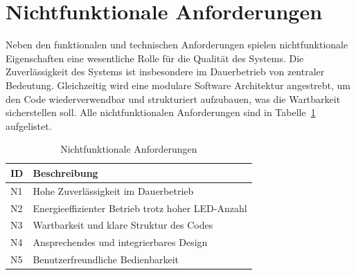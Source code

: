 \section{Nichtfunktionale Anforderungen}
Neben den funktionalen und technischen Anforderungen spielen nichtfunktionale Eigenschaften eine wesentliche Rolle für die Qualität des Systems.
Die Zuverlässigkeit des Systems ist insbesondere im Dauerbetrieb von zentraler Bedeutung.
Gleichzeitig wird eine modulare Software Architektur angestrebt, um den Code wiederverwendbar und strukturiert aufzubauen, was die Wartbarkeit sicherstellen soll.
Alle nichtfunktionalen Anforderungen sind in Tabelle~\ref{tab:Nichtfunktionale Anforderung} aufgelistet.

\begin{table}[H]
\caption{Nichtfunktionale Anforderungen}
\centering
\begin{tabular}{p{0.5cm} p{10cm}}
\textbf{ID} & \textbf{Beschreibung} \\
\hline
N1 & Hohe Zuverlässigkeit im Dauerbetrieb \\
N2 & Energieeffizienter Betrieb trotz hoher LED-Anzahl \\
N3 & Wartbarkeit und klare Struktur des Codes \\
N4 & Ansprechendes und integrierbares Design \\
N5 & Benutzerfreundliche Bedienbarkeit \\
\end{tabular}
\label{tab:Nichtfunktionale Anforderung}
\end{table}